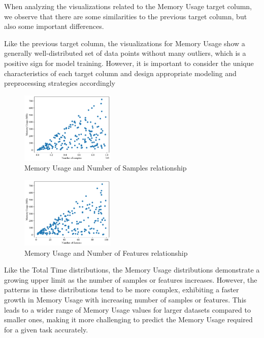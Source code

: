 \documentclass[conference]{IEEEtran}
\begin{document}
When analyzing the visualizations related to the Memory Usage target column, we observe that there are some similarities to the previous target column, but also some important differences.

Like the previous target column, the visualizations for Memory Usage show a generally well-distributed set of data points without many outliers, which is a positive sign for model training. However, it is important to consider the unique characteristics of each target column and design appropriate modeling and preprocessing strategies accordingly



\begin{figure}[ht]
    \centering
  \includegraphics[width=0.4\textwidth]{plots/experiment_results/kmeans_memory_samples.pdf}
    \caption{Memory Usage and Number of Samples relationship}
  \end{figure}
  
  \begin{figure}[ht]
      \centering
    \includegraphics[width=0.4\textwidth]{plots/experiment_results/kmeans_memory_features.pdf}
      \caption{Memory Usage and Number of Features relationship}
    \end{figure}

Like the Total Time distributions, the Memory Usage distributions demonstrate a growing upper limit as the number of samples or features increases. However, the patterns in these distributions tend to be more complex, exhibiting a faster growth in Memory Usage with increasing number of samples or features. This leads to a wider range of Memory Usage values for larger datasets compared to smaller ones, making it more challenging to predict the Memory Usage required for a given task accurately.
\end{document}
